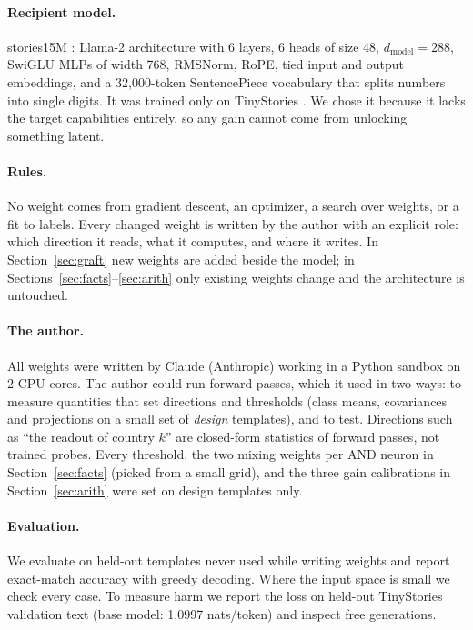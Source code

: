 \documentclass[11pt]{article}
\begin{document}
\paragraph{Recipient model.} stories15M \cite{llama2c}: Llama-2 architecture with 6 layers, 6 heads of size 48, $d_\text{model}=288$, SwiGLU MLPs of width 768, RMSNorm, RoPE, tied input and output embeddings, and a 32{,}000-token SentencePiece vocabulary that splits numbers into single digits. It was trained only on TinyStories \cite{tinystories}. We chose it because it lacks the target capabilities entirely, so any gain cannot come from unlocking something latent.

\paragraph{Rules.} No weight comes from gradient descent, an optimizer, a search over weights, or a fit to labels. Every changed weight is written by the author with an explicit role: which direction it reads, what it computes, and where it writes. In Section~\ref{sec:graft} new weights are added beside the model; in Sections~\ref{sec:facts}--\ref{sec:arith} only existing weights change and the architecture is untouched.

\paragraph{The author.} All weights were written by Claude (Anthropic) working in a Python sandbox on 2 CPU cores. The author could run forward passes, which it used in two ways: to measure quantities that set directions and thresholds (class means, covariances and projections on a small set of \emph{design} templates), and to test. Directions such as ``the readout of country $k$'' are closed-form statistics of forward passes, not trained probes. Every threshold, the two mixing weights per AND neuron in Section~\ref{sec:facts} (picked from a small grid), and the three gain calibrations in Section~\ref{sec:arith} were set on design templates only.

\paragraph{Evaluation.} We evaluate on held-out templates never used while writing weights and report exact-match accuracy with greedy decoding. Where the input space is small we check every case. To measure harm we report the loss on held-out TinyStories validation text (base model: 1.0997 nats/token) and inspect free generations.
\end{document}
